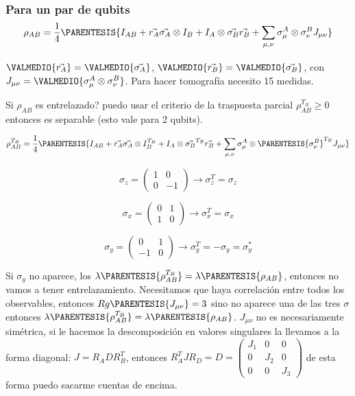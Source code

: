 \subsubsection{Para un par de qubits 
\[
\rho_{AB}=\frac{1}{4}\protect\PARENTESIS{I_{AB}+\vec{r_{A}}\vec{\sigma_{A}}\otimes I_{B}+I_{A}\otimes\vec{\sigma_{B}}\vec{r_{B}}+\sum_{\mu,\nu}\sigma_{\mu}^{A}\otimes\sigma_{\nu}^{B}J_{\mu\nu}}
\]
}

$\VALMEDIO{\vec{r_{A}}}=\VALMEDIO{\vec{\sigma_{A}}}$, $\VALMEDIO{\vec{r_{B}}}=\VALMEDIO{\vec{\sigma_{B}}}$,
con $J_{\mu\nu}=\VALMEDIO{\sigma_{\mu}^{A}\otimes\sigma_{\nu}^{B}}$.
Para hacer tomografía necesito 15 medidas. 

Si $\rho_{AB}$ es entrelazado? puedo usar el criterio de la traspuesta
parcial $\rho_{AB}^{T_{B}}\geq0$ entonces es separable (esto vale
para 2 qubits).

\[
\rho_{AB}^{T_{B}}=\frac{1}{4}\PARENTESIS{I_{AB}+\vec{r_{A}}\vec{\sigma_{A}}\otimes I_{B}^{T_{B}}+I_{A}\otimes\vec{\sigma_{B}}^{T_{B}}\vec{r_{B}}+\sum_{\mu,\nu}\sigma_{\mu}^{A}\otimes\PARENTESIS{\sigma_{\nu}^{B}}^{T_{B}}J_{\mu\nu}}
\]

\[
\sigma_{z}=\left(\begin{array}{cc}
1 & 0\\
0 & -1
\end{array}\right)\rightarrow\sigma_{z}^{T}=\sigma_{z}
\]

\[
\sigma_{x}=\left(\begin{array}{cc}
0 & 1\\
1 & 0
\end{array}\right)\rightarrow\sigma_{x}^{T}=\sigma_{x}
\]

\[
\sigma_{y}=\left(\begin{array}{cc}
0 & 1\\
-1 & 0
\end{array}\right)\rightarrow\sigma_{y}^{T}=-\sigma_{y}=\sigma_{y}^{*}
\]

Si $\sigma_{y}$ no aparece, los $\lambda\PARENTESIS{\rho_{AB}^{T_{B}}}=\lambda\PARENTESIS{\rho_{AB}}$,
entonces no vamos a tener entrelazamiento. Necesitamos que haya correlación
entre todos los observables, entonces $Rg\PARENTESIS{J_{\mu\nu}}=3$
sino no aparece una de las tres $\sigma$ entonces $\lambda\PARENTESIS{\rho_{AB}^{T_{B}}}=\lambda\PARENTESIS{\rho_{AB}}$.
$J_{\mu\nu}$ no es necesariamente simétrica, si le hacemos la descomposición
en valores singulares la llevamos a la forma diagonal: $J=R_{A}DR_{B}^{T}$,
entonces $R_{A}^{T}JR_{D}=D=\left(\begin{array}{ccc}
J_{1} & 0 & 0\\
0 & J_{2} & 0\\
0 & 0 & J_{3}
\end{array}\right)$ de esta forma puedo sacarme cuentas de encima. 

